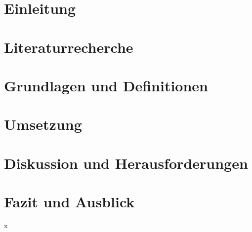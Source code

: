 \documentclass[
english,
german,
main=german,
final,
]{bachelor}
\begin{document}





\section{Einleitung}


\section{Literaturrecherche}


\section{Grundlagen und Definitionen}


\section{Umsetzung}


\section{Diskussion und Herausforderungen}




\section{Fazit und Ausblick}






\cleardoublepage

x
\newpage

\appendix

\printbibliography
{}
\listoflistings
{}
\listoftables
{}
\listoffigures
{}%
\listofmyalgorithms
\end{document}
